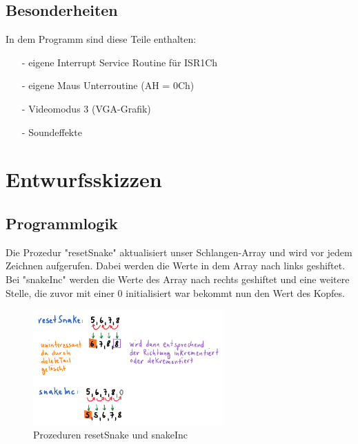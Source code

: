 \documentclass[a4paper,10pt]{article}
\begin{document}
		\subsection{Besonderheiten}
			In dem Programm sind diese Teile enthalten:
			\begin{itemize}
				\item[-] eigene Interrupt Service Routine für ISR1Ch
				\item[-] eigene Maus Unterroutine (AH = 0Ch)
				\item[-] Videomodus 3 (VGA-Grafik)
				\item[-] Soundeffekte
			\end{itemize}
		\newpage
	\section{Entwurfsskizzen}
		
		\subsection{Programmlogik}
			Die Prozedur "\-resetSnake" \- aktualisiert unser
			Schlangen-Array und wird vor jedem Zeichnen aufgerufen. Dabei 
			werden die Werte in dem Array nach links geshiftet. \\
			Bei "snakeInc" \- werden die Werte des Array nach rechts geshiftet 
			und eine weitere Stelle, die zuvor mit einer 0 initialisiert war 
			bekommt nun den Wert des Kopfes. \\
			\begin{figure}[h]
				\centering
				\includegraphics[width=0.65\textwidth]{prog}
				\caption{Prozeduren resetSnake und snakeInc}
				\label{SnakPro}
			\end{figure}
			
\end{document}
